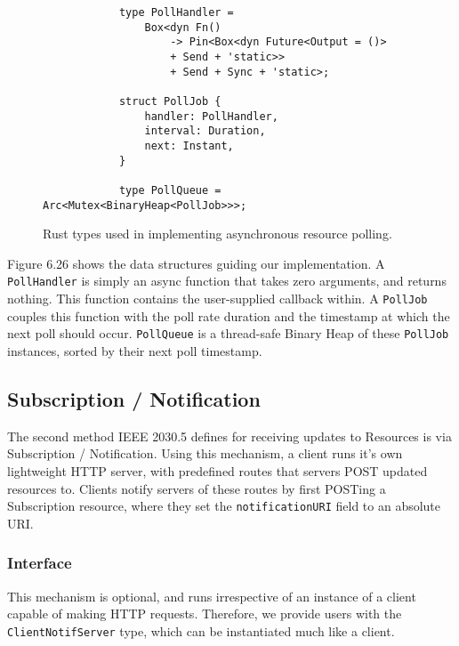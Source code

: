 \begin{figure}[h]
    \begin{center}
        \begin{lstlisting}
            type PollHandler =
                Box<dyn Fn() 
                    -> Pin<Box<dyn Future<Output = ()> 
                    + Send + 'static>> 
                    + Send + Sync + 'static>;

            struct PollJob {
                handler: PollHandler,
                interval: Duration,
                next: Instant,
            }

            type PollQueue = Arc<Mutex<BinaryHeap<PollJob>>>;

        \end{lstlisting}
        \label{fig:pollimplds}
        \vspace{-10pt}
        \caption{Rust types used in implementing asynchronous resource polling.}
    \end{center}
\end{figure}

Figure 6.26 shows the data structures guiding our implementation. A \texttt{PollHandler} is simply an async function that takes zero arguments, and returns nothing. This function contains the user-supplied callback within. A \texttt{PollJob} couples this function with the poll rate duration and the timestamp at which the next poll should occur.
\texttt{PollQueue} is a thread-safe Binary Heap of these \texttt{PollJob} instances, sorted by their next poll timestamp.


\subsection{Subscription / Notification}
The second method IEEE 2030.5 defines for receiving updates to Resources is via Subscription / Notification.
Using this mechanism, a client runs it's own lightweight HTTP server, with predefined routes that servers POST updated resources to. Clients notify servers of these routes by first POSTing a Subscription resource, where they set the \texttt{notificationURI} field to an absolute URI.

\subsubsection{Interface}
This mechanism is optional, and runs irrespective of an instance of a client capable of making HTTP requests. Therefore, we provide users with the \texttt{ClientNotifServer} type, which can be instantiated much like a client.

